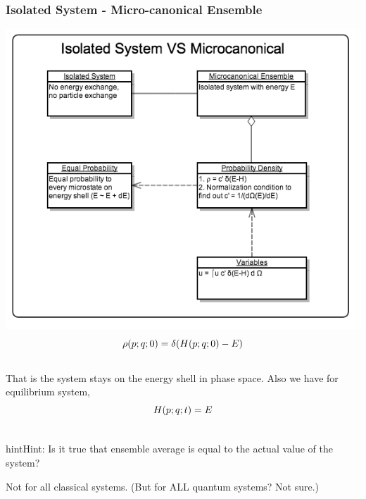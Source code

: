 \documentclass[letterpaper,10pt,english]{sphinxmanual}
\begin{document}

\subsubsection{Isolated System - Micro-canonical Ensemble}
\label{equilibrium/week5:index-1}\label{equilibrium/week5:isolated-system-micro-canonical-ensemble}
{\hfill\includegraphics{microcanonical.png}\hfill}
\begin{gather}
\begin{split}\rho(p;q;0) = \delta(H(p;q;0) - E)\end{split}\notag\\\begin{split}\end{split}\notag
\end{gather}
That is the system stays on the energy shell in phase space. Also we have for equilibrium system,
\begin{gather}
\begin{split}H(p;q;t) = E\end{split}\notag\\\begin{split}\end{split}\notag
\end{gather}
\begin{notice}{hint}{Hint:}
Is it true that ensemble average is equal to the actual value of the system?

Not for all classical systems. (But for ALL quantum systems? Not sure.)
\end{notice}
\end{document}
